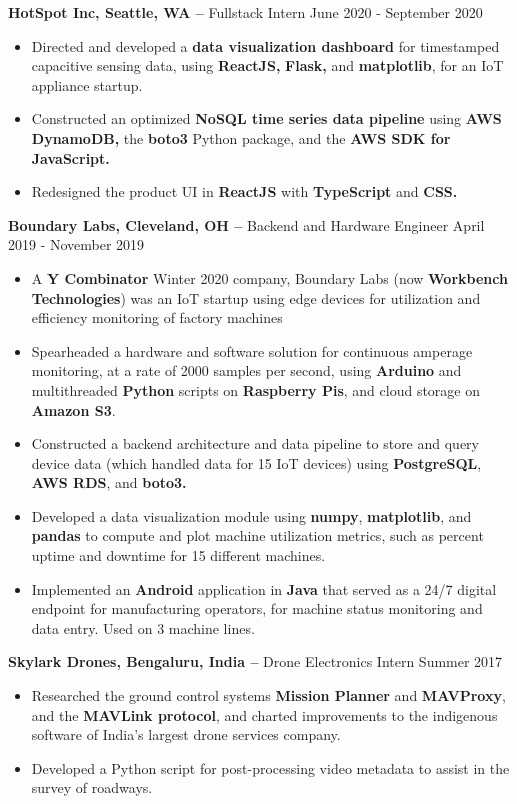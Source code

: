 \documentclass{res}
\begin{document}
\begin{resume}
\begin{itemize}
\end{itemize}
 {\bf HotSpot Inc, Seattle, WA –} Fullstack Intern   \hfill June 2020 - September 2020
 \begin{itemize} \itemsep -2pt  %
 \item Directed and developed a \textbf{data visualization dashboard} for timestamped capacitive sensing data, using \mbox{\textbf{ReactJS,}} \textbf{Flask,} and \textbf{matplotlib}, for an IoT appliance startup.
 \item Constructed an optimized \textbf{NoSQL time series data pipeline} using \textbf{AWS DynamoDB,} the \textbf{boto3}  Python package, and the \textbf{AWS SDK for JavaScript.}
 \item Redesigned the product UI in \textbf{ReactJS} with \textbf{TypeScript} and \textbf{CSS.}
 \end{itemize}
 {\bf Boundary Labs, Cleveland, OH –} Backend and Hardware Engineer   \hfill April  2019 - November 2019 
 \begin{itemize} \itemsep -2pt  %
 \item A \textbf{Y Combinator} Winter 2020 company, Boundary Labs (now \textbf{Workbench Technologies}) was an IoT startup using edge devices for utilization and efficiency monitoring of factory machines 
 \item Spearheaded a hardware and software solution for continuous amperage monitoring, at a rate of 2000 samples per second, using \textbf{Arduino} and multithreaded \textbf{Python} scripts on \textbf{Raspberry Pis}, and cloud storage on \textbf{Amazon S3}.
 \item Constructed a backend architecture and data pipeline to store and query device data (which  handled data for 15 IoT devices) using \textbf{PostgreSQL}, \textbf{AWS RDS}, and  \textbf{boto3.} 
 \item Developed a data visualization module using \textbf{numpy}, \textbf{matplotlib}, and \textbf{pandas} to compute and plot machine utilization metrics, such as percent uptime and downtime for 15 different machines.
 \item Implemented an \textbf{Android} application in \textbf{Java} that served as a 24/7 digital endpoint for manufacturing operators, for machine status monitoring and data entry. Used on 3 machine lines.
 \end{itemize}
 
 {\bf Skylark Drones, Bengaluru, India –} Drone Electronics Intern  \hfill  Summer 2017
\begin{itemize} \itemsep -2pt %
\item Researched  the ground control systems \textbf{Mission Planner} and \textbf{MAVProxy}, and the \textbf{MAVLink protocol}, and charted improvements to the indigenous software of India's largest drone services company.
\item Developed a Python script for post-processing video metadata to assist in the survey of roadways.
\end{itemize}



\end{resume}
\end{document}
